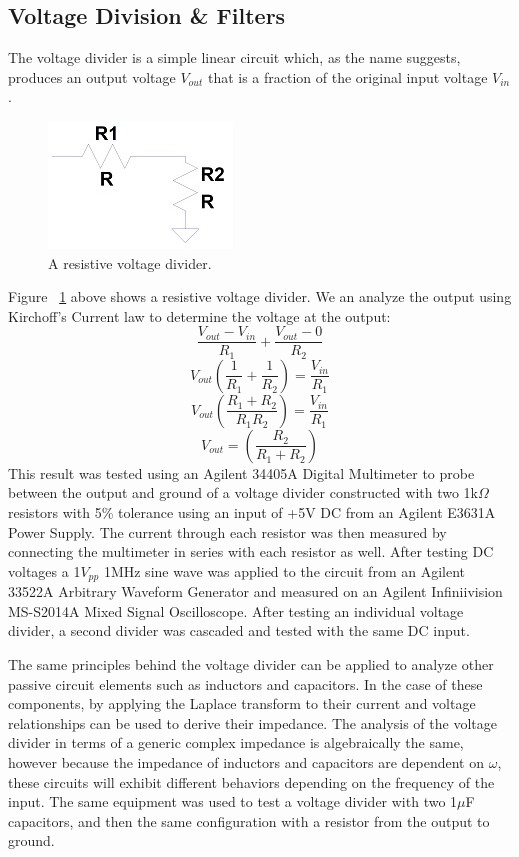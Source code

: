 \documentclass[11pt]{article}
\begin{document}
  \subsection{Voltage Division \& Filters}
      The voltage divider is a simple linear circuit which, as the name suggests, produces an output voltage $V_{out}$ that is a fraction of the original input voltage $V_{in}$.  
    \begin{figure}[h!]
    \centering
    \includegraphics[scale=1.7]{voltage_divider.jpg}
    \caption{A resistive voltage divider.}
    \label{fig:voltage_divider}
    \end{figure}
    
    Figure ~\ref{fig:voltage_divider} above shows a resistive voltage divider.  We an analyze the output using Kirchoff's Current law to determine the voltage at the output:
    $$\frac{V_{out} - V_{in}}{R_1} + \frac{V_{out} - 0}{R_2}$$
    $$V_{out}\left(\frac{1}{R_1} + \frac{1}{R_2}\right) = \frac{V_{in}}{R_1}$$  
    $$V_{out}\left(\frac{R_1 + R_2}{R_1R_2}\right) = \frac{V_{in}}{R_1}$$  
    $$V_{out}= \left(\frac{R_2}{R_1+R_2}\right)$$  
    This result was tested using an Agilent 34405A Digital Multimeter to probe between the output and ground of a voltage divider constructed with two 1k$\Omega$ resistors with 5\% tolerance using an input of +5V DC from an Agilent E3631A Power Supply. The current through each resistor was then measured by connecting the multimeter in series with each resistor as well. After testing DC voltages a 1$V_{pp}$ 1MHz sine wave was applied to the circuit from an Agilent 33522A Arbitrary Waveform Generator and measured on an Agilent Infiniivision MS-S2014A Mixed Signal Oscilloscope.  After testing an individual voltage divider, a second divider was cascaded and tested with the same DC input.
    
    The same principles behind the voltage divider can be applied to analyze other passive circuit elements such as inductors and capacitors. In the case of these components, by applying the Laplace transform to their current and voltage relationships can be used to derive their impedance. The analysis of the voltage divider in terms of a generic complex impedance is algebraically the same, however because the impedance of inductors and capacitors are dependent on $\omega$, these circuits will exhibit different behaviors depending on the frequency of the input.
    The same equipment was used to test a voltage divider with two 1$\mu$F capacitors, and then the same configuration with a resistor from the output to ground.
    
\end{document}
